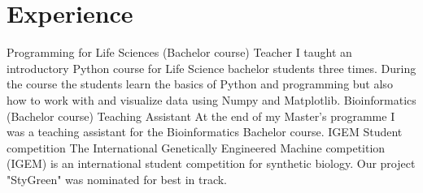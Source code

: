 \documentclass[letterpaper]{twentysecondcv} %
\begin{document}

\section{Experience}

\begin{twenty} %
		{Programming for Life Sciences (Bachelor course)}
		{Teacher}
		{I taught an introductory Python course for Life Science bachelor students three times. During the course the students learn the basics of Python and programming but also how to work with and visualize data using Numpy and Matplotlib.}
		{Bioinformatics (Bachelor course)}
		{Teaching Assistant}
		{At the end of my Master's programme I was a teaching assistant for the Bioinformatics Bachelor course.}
		{IGEM}
		{Student competition}
		{The International Genetically Engineered Machine competition (IGEM) is an international student competition for synthetic biology. Our project "StyGreen" was nominated for best in track.}
\end{twenty}


%
%
\end{document}
